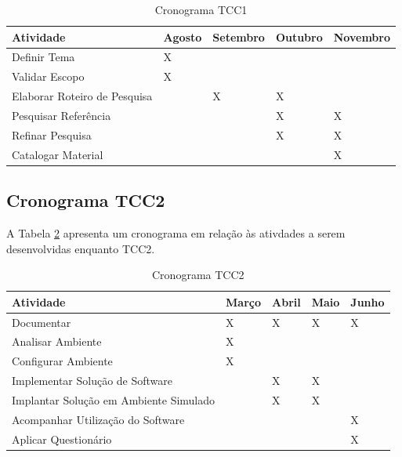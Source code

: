 \begin{table}[h!]
\centering
\caption{Cronograma TCC1}
\label{cronograma_tcc1}
\begin{tabular}{lllll}
\textbf{Atividade}           & \textbf{Agosto} & \textbf{Setembro} & \textbf{Outubro} & \textbf{Novembro} \\ \hline
Definir Tema                 & X               &                   &                  &                   \\ \hline
Validar Escopo               & X               &                   &                  &                   \\ \hline
Elaborar Roteiro de Pesquisa &                 & X                 & X                &                   \\ \hline
Pesquisar Referência         &                 &                   & X                & X                 \\ \hline
Refinar Pesquisa             &                 &                   & X                & X                 \\ \hline
Catalogar Material           &                 &                   &                  & X                 \\ \hline
\end{tabular}
\end{table}

\subsection{Cronograma TCC2}
A Tabela \ref{cronograma_tcc2} apresenta um cronograma em relação às ativdades a serem desenvolvidas enquanto TCC2.
\begin{table}[h!]
\centering
\caption{Cronograma TCC2}
\label{cronograma_tcc2}
\begin{tabular}{lllll}
\textbf{Atividade}                     & \textbf{Março} & \textbf{Abril} & \textbf{Maio} & \textbf{Junho} \\ \hline
Documentar                             & X              & X              & X             & X              \\ \hline
Analisar Ambiente                      & X              &                &               &                \\ \hline
Configurar Ambiente                    & X              &                &               &                \\ \hline
Implementar Solução de Software        &                & X              & X             &                \\ \hline
Implantar Solução em Ambiente Simulado &                & X              & X             &                \\ \hline
Acompanhar Utilização do Software      &                &                &               & X              \\ \hline
Aplicar Questionário                   &                &                &               & X              \\ \hline
\end{tabular}
\end{table}

